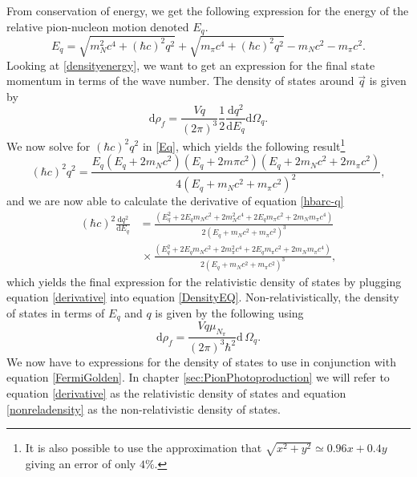 From conservation of energy, we get the following expression for the energy of the relative pion-nucleon motion denoted $E_q$. 
\begin{equation} \label{Eq}
	E_q = \sqrt{m_N^2 c^4+(\hbar c)^2q^2} + \sqrt{m_\pi c^4+(\hbar c)^2 q^2}-m_N c^2-m_\pi c^2.
\end{equation}
Looking at \eqref{densityenergy}, we want to get an expression for the final state momentum in terms of the wave number. The density of states around $\vec{q}$ is given by
\begin{equation} \label{DensityEQ}
	\text{d}\rho_f = \frac{Vq}{(2\pi)^3}\frac{1}{2}\frac{\text{d}q^2}{\text{d}E_q} \text{d}\Omega_q.
\end{equation}
We now solve for $(\hbar c)^2q^2$ in \eqref{Eq}, which yields the following result\footnote{It is also possible to use the approximation that $\sqrt{x^2+y^2}\simeq 0.96x+0.4y$ giving an error of only $4\%$.}
\begin{equation} \label{hbarc-q}
	(\hbar c)^2 q^2 = \frac{E_q(E_q+2m_N c^2)(E_q+2m\pi c^2)(E_q+2m_N c^2+2m_\pi c^2)}{4(E_q+m_N c^2+m_\pi c^2)^2},
\end{equation}
and we are now able to calculate the derivative of equation \eqref{hbarc-q}
\begin{equation}\begin{split} \label{derivative}
		(\hbar c)^2\frac{\text{d}q^2}{\text{d}E_q} &= \frac{(E_q^2+2E_q m_N c^2+2m_N^2 c^4+2E_q m_\pi c^2+2m_N m_\pi c^4)}{2(E_q+m_N c^2+m_\pi c^2)^3} \\
		& \, \times \frac{(E_q^2+2E_q m_N c^2 +2m_\pi^2 c^4 +2E_q m_\pi c^2+2m_N m_\pi c^4)}{2(E_q+m_N c^2+m_\pi c^2)^3},
	\end{split}
\end{equation} 
which yields the final expression for the relativistic density of states by plugging equation \eqref{derivative} into equation \eqref{DensityEQ}. Non-relativistically, the density of states in terms of $E_q$ and $q$ is given by the following using 
\begin{equation}\label{nonreladensity}
	\text{d}\rho_f = \frac{Vq\mu_{N_\pi}}{(2\pi)^3\hbar^2} \text{d}\,\Omega_q.
\end{equation}
We now have to expressions for the density of states to use in conjunction with equation \eqref{FermiGolden}. In chapter \ref{sec:PionPhotoproduction} we will refer to equation \eqref{derivative} as the relativistic density of states and equation \eqref{nonreladensity} as the non-relativistic density of states.
